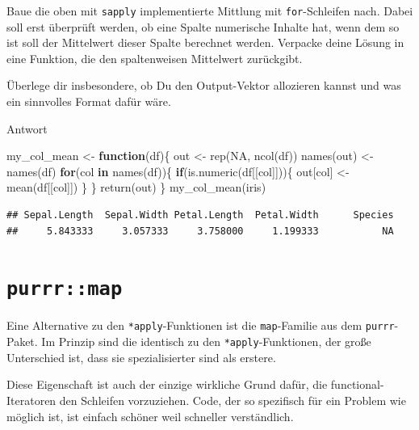 \documentclass[
]{book}
\newenvironment{Shaded}{\begin{snugshade}}{\end{snugshade}}
\newcommand{\ConstantTok}[1]{\textcolor[rgb]{0.00,0.00,0.00}{#1}}
\newcommand{\ControlFlowTok}[1]{\textcolor[rgb]{0.13,0.29,0.53}{\textbf{#1}}}
\newcommand{\FunctionTok}[1]{\textcolor[rgb]{0.00,0.00,0.00}{#1}}
\newcommand{\NormalTok}[1]{#1}
\newcommand{\OtherTok}[1]{\textcolor[rgb]{0.56,0.35,0.01}{#1}}
\begin{document}
Baue die oben mit \texttt{sapply} implementierte Mittlung mit \texttt{for}-Schleifen nach.
Dabei soll erst überprüft werden, ob eine Spalte numerische Inhalte hat, wenn dem so ist soll der Mittelwert dieser Spalte berechnet werden.
Verpacke deine Lösung in eine Funktion, die den spaltenweisen Mittelwert zurückgibt.

Überlege dir insbesondere, ob Du den Output-Vektor allozieren kannst und was ein sinnvolles Format dafür wäre.

Antwort

\begin{Shaded}
\begin{Highlighting}[]
\NormalTok{my\_col\_mean }\OtherTok{\textless{}{-}} \ControlFlowTok{function}\NormalTok{(df)\{}
\NormalTok{  out }\OtherTok{\textless{}{-}} \FunctionTok{rep}\NormalTok{(}\ConstantTok{NA}\NormalTok{, }\FunctionTok{ncol}\NormalTok{(df))}
  \FunctionTok{names}\NormalTok{(out) }\OtherTok{\textless{}{-}} \FunctionTok{names}\NormalTok{(df)}
  \ControlFlowTok{for}\NormalTok{(col }\ControlFlowTok{in} \FunctionTok{names}\NormalTok{(df))\{}
    \ControlFlowTok{if}\NormalTok{(}\FunctionTok{is.numeric}\NormalTok{(df[[col]]))\{}
\NormalTok{      out[col] }\OtherTok{\textless{}{-}} \FunctionTok{mean}\NormalTok{(df[[col]])}
\NormalTok{    \}}
\NormalTok{  \}}
  \FunctionTok{return}\NormalTok{(out)}
\NormalTok{\}}
\FunctionTok{my\_col\_mean}\NormalTok{(iris)}
\end{Highlighting}
\end{Shaded}

\begin{verbatim}
## Sepal.Length  Sepal.Width Petal.Length  Petal.Width      Species 
##     5.843333     3.057333     3.758000     1.199333           NA
\end{verbatim}

\hypertarget{purrrmap}{%
\section{\texorpdfstring{\texttt{purrr::map}}{purrr::map}}\label{purrrmap}}

Eine Alternative zu den \texttt{*apply}-Funktionen ist die \texttt{map}-Familie aus dem \texttt{purrr}-Paket. Im Prinzip sind die identisch zu den \texttt{*apply}-Funktionen, der große Unterschied ist, dass sie spezialisierter sind als erstere.

Diese Eigenschaft ist auch der einzige wirkliche Grund dafür, die functional-Iteratoren den Schleifen vorzuziehen. Code, der so spezifisch für ein Problem wie möglich ist, ist einfach schöner weil schneller verständlich.
\end{document}
